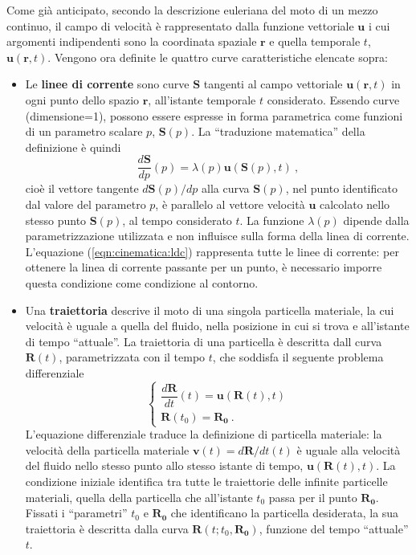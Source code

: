 Come già anticipato, secondo la descrizione euleriana del moto di un mezzo continuo, il campo di velocità è rappresentato dalla funzione vettoriale $\bm{u}$ i cui argomenti indipendenti sono la coordinata spaziale $\bm{r}$ e quella temporale $t$, $\bm{u}(\bm{r},t)$. Vengono ora definite le quattro curve caratteristiche elencate sopra:
\begin{itemize}
\item
Le \textbf{linee di corrente} sono curve $\bm{S}$ tangenti al campo vettoriale $\bm{u}(\bm{r},t)$ in ogni punto dello spazio $\bm{r}$, all'istante temporale $t$ considerato. Essendo curve (dimensione=1), possono essere espresse in forma parametrica come funzioni di un parametro scalare $p$, $\bm{S}(p)$. La ``traduzione matematica'' della definizione è quindi
\begin{equation}\label{eqn:cinematica:ldc}
 \frac{d\bm{S}}{dp}(p) = \lambda(p) \bm{u}(\bm{S}(p),t) \ ,
\end{equation}
cioè il vettore tangente ${d\bm{S}(p)}/{dp}$ alla curva $\bm{S}(p)$, nel punto identificato dal valore del parametro $p$, è parallelo al vettore velocità $\bm{u}$ calcolato nello stesso punto $\bm{S}(p)$, al tempo considerato $t$.
La funzione $\lambda(p)$ dipende dalla parametrizzazione utilizzata e non influisce sulla forma della linea di corrente. L'equazione (\ref{eqn:cinematica:ldc}) rappresenta tutte le linee di corrente: per ottenere la linea di corrente passante per un punto, è necessario imporre questa condizione come condizione al contorno.

\item
Una \textbf{traiettoria} descrive il moto di una singola particella materiale, la cui velocità è uguale a quella del fluido, nella posizione in cui si trova e all'istante di tempo ``attuale''. La traiettoria di una particella è descritta dall curva $\bm{R}(t)$, parametrizzata con il tempo $t$, che soddisfa il seguente problema differenziale 
\begin{equation}
\begin{cases}
 \dfrac{d\bm{R}}{dt}(t) = \bm{u}(\bm{R}(t),t) \\
 \bm{R}(t_0) = \bm{R_0} \ .
\end{cases}
\end{equation}
L'equazione differenziale traduce la definizione di particella materiale: la velocità della particella materiale $\bm{v}(t) = d \bm{R} / dt (t)$ è uguale alla velocità del fluido nello stesso punto allo stesso istante di tempo, $\bm{u}(\bm{R}(t),t)$.
La condizione iniziale identifica tra tutte le traiettorie delle infinite particelle materiali, quella della particella che all'istante $t_0$ passa per il punto $\bm{R_0}$.\newline
Fissati i ``parametri'' $t_0$ e $\bm{R_0}$ che identificano la particella desiderata, la sua traiettoria è descritta dalla curva $\bm{R}(t;t_0,\bm{R_0})$, funzione del tempo ``attuale'' $t$.


\end{itemize}
